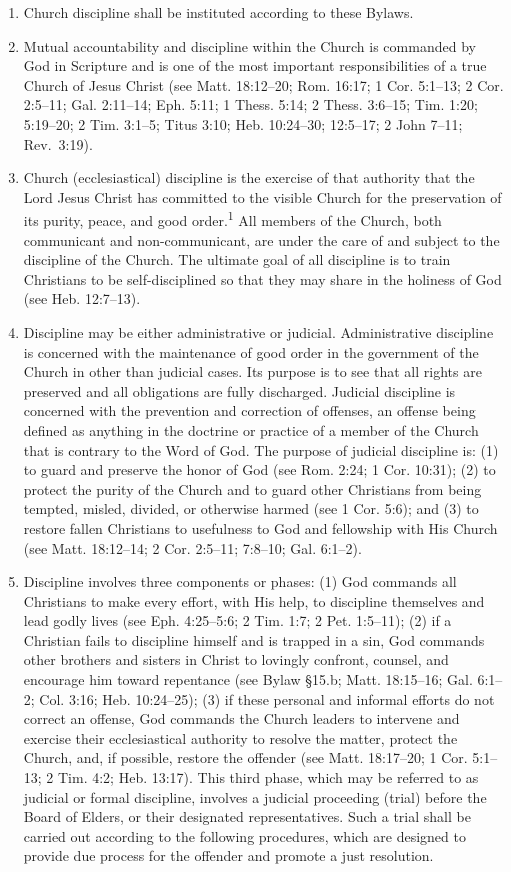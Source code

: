 \documentclass[
]{book}
\begin{document}
\begin{enumerate}
\def\labelenumi{\arabic{enumi}.}
\item
  Church discipline shall be instituted according to these Bylaws.
\item
  Mutual accountability and discipline within the Church is commanded by God in Scripture and is one of the most important responsibilities of a true Church of Jesus Christ (see Matt. 18:12--20; Rom. 16:17; 1 Cor. 5:1--13; 2 Cor. 2:5--11; Gal. 2:11--14; Eph. 5:11; 1 Thess. 5:14; 2 Thess. 3:6--15; Tim. 1:20; 5:19--20; 2 Tim. 3:1--5; Titus 3:10; Heb. 10:24--30; 12:5--17; 2 John 7--11; Rev.~3:19).
\item
  Church (ecclesiastical) discipline is the exercise of that authority that the Lord Jesus Christ has committed to the visible Church for the preservation of its purity, peace, and good order.\textsuperscript{1} All members of the Church, both communicant and non-communicant, are under the care of and subject to the discipline of the Church. The ultimate goal of all discipline is to train Christians to be self-disciplined so that they may share in the holiness of God (see Heb. 12:7--13).
\item
  Discipline may be either administrative or judicial. Administrative discipline is concerned with the maintenance of good order in the government of the Church in other than judicial cases. Its purpose is to see that all rights are preserved and all obligations are fully discharged. Judicial discipline is concerned with the prevention and correction of offenses, an offense being defined as anything in the doctrine or practice of a member of the Church that is contrary to the Word of God. The purpose of judicial discipline is: (1) to guard and preserve the honor of God (see Rom. 2:24; 1 Cor. 10:31); (2) to protect the purity of the Church and to guard other Christians from being tempted, misled, divided, or otherwise harmed (see 1 Cor. 5:6); and (3) to restore fallen Christians to usefulness to God and fellowship with His Church (see Matt. 18:12--14; 2 Cor. 2:5--11; 7:8--10; Gal. 6:1--2).
\item
  Discipline involves three components or phases: (1) God commands all Christians to make every effort, with His help, to discipline themselves and lead godly lives (see Eph. 4:25--5:6; 2 Tim. 1:7; 2 Pet. 1:5--11); (2) if a Christian fails to discipline himself and is trapped in a sin, God commands other brothers and sisters in Christ to lovingly confront, counsel, and encourage him toward repentance (see Bylaw §15.b; Matt. 18:15--16; Gal. 6:1--2; Col. 3:16; Heb. 10:24--25); (3) if these personal and informal efforts do not correct an offense, God commands the Church leaders to intervene and exercise their ecclesiastical authority to resolve the matter, protect the Church, and, if possible, restore the offender (see Matt. 18:17--20; 1 Cor. 5:1--13; 2 Tim. 4:2; Heb. 13:17). This third phase, which may be referred to as judicial or formal discipline, involves a judicial proceeding (trial) before the Board of Elders, or their designated representatives. Such a trial shall be carried out according to the following procedures, which are designed to provide due process for the offender and promote a just resolution.

\end{enumerate}
\end{document}
